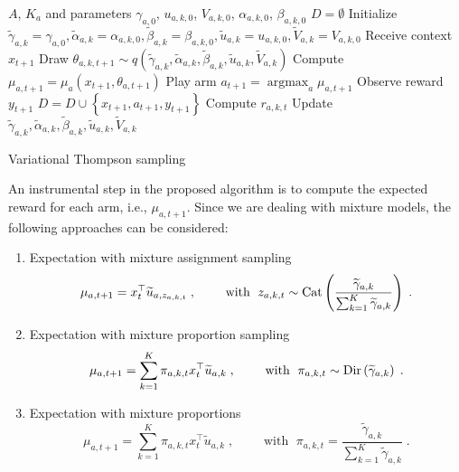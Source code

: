 \documentclass[10pt]{article}
\newcommand{\ie}{i.e., }
\newcommand{\Dir}{{\rm Dir}}
\newcommand{\Cat}{{\rm Cat}}
\newcommand{\argmax}{\mathop{\mathrm{argmax}}}
\begin{document}
\begin{algorithm}
	\begin{algorithmic}
	\Require $A$, $K_a$ and parameters $\gamma_{a,0}$, $u_{a,k,0}$, $V_{a,k,0}$, $\alpha_{a,k,0}$, $\beta_{a,k,0}$
	\State $D=\emptyset$
	\State Initialize $\widetilde{\gamma}_{a,k}=\gamma_{a,0}, \widetilde{\alpha}_{a,k}=\alpha_{a,k,0}, \widetilde{\beta}_{a,k}=\beta_{a,k,0}, \widetilde{u}_{a,k}=u_{a,k,0}, \widetilde{V}_{a,k}=V_{a,k,0}$
		\State Receive context $x_{t+1}$
				\State Draw $\theta_{a,k,t+1} \sim q\left(\widetilde{\gamma}_{a,k}, \widetilde{\alpha}_{a,k}, \widetilde{\beta}_{a,k}, \widetilde{u}_{a,k}, \widetilde{V}_{a,k}\right)$
			\EndFor
			\State Compute $\mu_{a,t+1}=\mu_{a}(x_{t+1},\theta_{a,t+1})$
		\EndFor
		\State Play arm $a_{t+1}=\argmax_{a}\mu_{a,t+1}$
		\State Observe reward $y_{t+1}$
		\State $D=D \cup \left\{x_{t+1}, a_{t+1}, y_{t+1}\right\}$
			\State Compute $r_{a,k,t}$
			\State Update $\widetilde{\gamma}_{a,k}, \widetilde{\alpha}_{a,k}, \widetilde{\beta}_{a,k}, \widetilde{u}_{a,k}, \widetilde{V}_{a,k}$
		\EndWhile
	\EndFor
	\end{algorithmic}
	\caption{Variational Thompson sampling}
	\label{alg:vts}
\end{algorithm}

An instrumental step in the proposed algorithm is to compute the expected reward for each arm, \ie $\mu_{a,t+1}$. Since we are dealing with mixture models, the following approaches can be considered:
\begin{enumerate}
	\item Expectation with mixture assignment sampling
	\begin{equation}
	\mu_{a,t+1}=x_{t}^\top \widetilde{u}_{a,z_{a,k,t}} \;, \qquad \text{ with } \; z_{a,k,t} \sim \Cat \left(\frac{\widetilde{\gamma}_{a,k}}{\sum_{k=1}^{K}\widetilde{\gamma}_{a,k}} \right) \;.
	\end{equation}
	\item Expectation with mixture proportion sampling
	\begin{equation}
	\mu_{a,t+1}=\sum_{k=1}^K \pi_{a,k,t} x_{t}^\top \widetilde{u}_{a,k} \;, \qquad \text{ with } \; \pi_{a,k,t} \sim \Dir\left(\widetilde{\gamma}_{a,k} \right) \;.
	\end{equation}
	\item Expectation with mixture proportions
	\begin{equation}
	\mu_{a,t+1}=\sum_{k=1}^K \pi_{a,k,t} x_{t}^\top \widetilde{u}_{a,k} \;, \qquad \text{ with } \; \pi_{a,k,t} = \frac{\widetilde{\gamma}_{a,k}}{\sum_{k=1}^{K}\widetilde{\gamma}_{a,k}} \;.
	\end{equation}
\end{enumerate}
\end{document}
